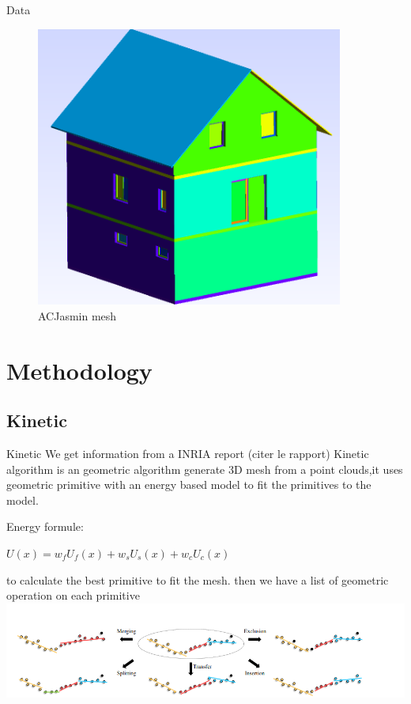 \documentclass[10pt]{beamer}
\begin{document}
\begin{frame}{Data}
\begin{figure}
\begin{minipage}{0.33\textwidth}
        \end{minipage}
        \begin{minipage}{0.33\textwidth}
            \centering
            \includegraphics[width=0.9\textwidth]{../image/ACJasmin.png}
        \end{minipage}
        \caption{ACJasmin mesh}
    \end{figure}
\end{frame}


\section{Methodology}
\subsection{Kinetic}
\begin{frame}{Kinetic}
We get information from a INRIA report (citer le rapport)
Kinetic algorithm is an geometric algorithm generate 3D mesh from a point clouds,it uses  geometric primitive with an energy based model to fit the primitives to the model.

Energy formule: 
\newline
\begin{center}
    $        U(x) = w_f U_f(x) + w_s U_s(x) + w_c U_c(x)       $
\end{center}

to calculate the best primitive to fit the mesh.
then we have a list of geometric operation on each primitive
\includegraphics[scale=0.35]{../image/primitives_operation.png}
\end{frame}
\end{document}
